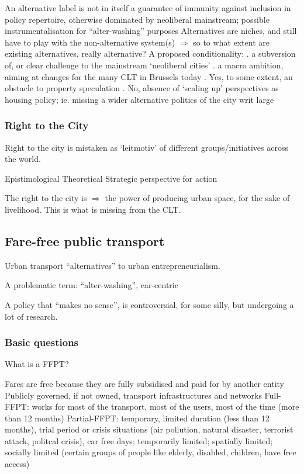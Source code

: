 \documentclass{article}
\begin{document}
\begin{outline}
	\1 An alternative label is not in itself a guarantee of immunity against inclusion in policy repertoire, otherwise dominated by neoliberal mainstream; possible instrumentalisation for ``alter-washing'' purposes
	\1 Alternatives are niches, and still have to play with the non-alternative system(s)
	\1 $\Rightarrow$ so to what extent are existing alternatives, really alternative? A proposed conditionality:
		. a subversion of, or clear challenge to the mainstream `neoliberal cities'
		. a macro ambition, aiming at changes for the many
	\1 CLT in Brussels today
		. Yes, to some extent, an obstacle to property speculation
		. No, absence of `scaling up' perspectives as housing policy; ie. missing a wider alternative politics of the city writ large
\end{outline}

\subsubsection{Right to the City}

Right to the city is mistaken as `leitmotiv' of different groups/initiatives across the world.

\begin{outline}
	\1 Epistimological
	\1 Theoretical
	\1 Strategic perspective for action
\end{outline}

The right to the city is $\Rightarrow$ the power of producing urban space, for the sake of livelihood. This is what is missing from the CLT. 

\subsection{Fare-free public transport}

Urban transport ``alternatives'' to urban entrepreneurialism.

A problematic term: ``alter-washing'', car-centric 

A policy that ``makes no sense'', is controversial, for some silly, but undergoing a lot of research.

\subsubsection{Basic questions}

What is a FFPT?

\begin{outline}
	\1 Fares are free because they are fully subsidised and paid for by another entity
	\1 Publicly governed, if not owned, transport infrastructures and networks
	\1 Full-FFPT: works for most of the transport, most of the users, most of the time (more than 12 months)
	\1 Partial-FFPT: temporary, limited duration (less than 12 months), trial period or crisis situations (air pollution, natural disaster, terrorist attack, politcal crisis), car free days; temporarily limited; spatially limited; socially limited (certain groups of people like elderly, disabled, children, have free access)
\end{outline}
\end{document}
